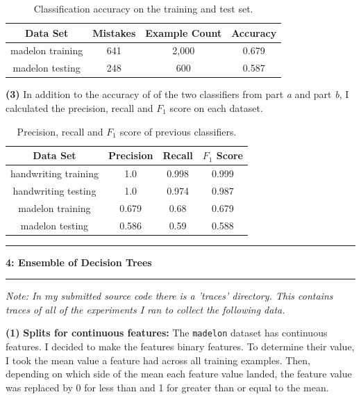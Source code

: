 \documentclass[11pt]{article}
\newcommand\question[2]{\vspace{.25in}\hrule\textbf{#1: #2}\vspace{.5em}\hrule\vspace{.10in}}
\renewcommand\part[1]{\vspace{.10in}\textbf{(#1)}}
\begin{document}
 \begin{table}[H]
\centering
{\renewcommand{\arraystretch}{1.2}%
\begin{tabular}{| c | c | c | c |}
\hline
Data Set & Mistakes & Example Count & Accuracy\\
\hline
madelon training & 641 & 2,000 & 0.679\\ \hline
madelon testing & 248 & 600 & 0.587\\ \hline
\end{tabular}}
\caption{Classification accuracy on the training and test set.}
\end{table}

\part{3} In addition to the accuracy of of the two classifiers from part \textit{a} and part \textit{b}, I calculated the precision, recall and $F_1$ score on each dataset.

 \begin{table}[H]
\centering
{\renewcommand{\arraystretch}{1.2}%
\begin{tabular}{| c | c | c | c |}
\hline
Data Set & Precision & Recall & $F_1$ Score\\
\hline
handwriting training & 1.0 & 0.998 & 0.999\\ \hline
handwriting testing & 1.0 & 0.974 & 0.987\\ \hline
madelon training & 0.679 & 0.68 & 0.679\\ \hline
madelon testing & 0.586 & 0.59 & 0.588\\ \hline
\end{tabular}}
\caption{Precision, recall and $F_1$ score of previous classifiers.}
\end{table}

\question{4}{Ensemble of Decision Trees}
\textit{Note: In my submitted source code there is a 'traces' directory. This contains traces of all of the experiments I ran to collect the following data.}

\part{1} \textbf{Splits for continuous features:} The {\tt madelon} dataset has continuous features. I decided to make the features binary features. To determine their value, I took the mean value a feature had across all training examples. Then, depending on which side of the mean each feature value landed, the feature value was replaced by 0 for less than and 1 for greater than or equal to the mean.
\end{document}
